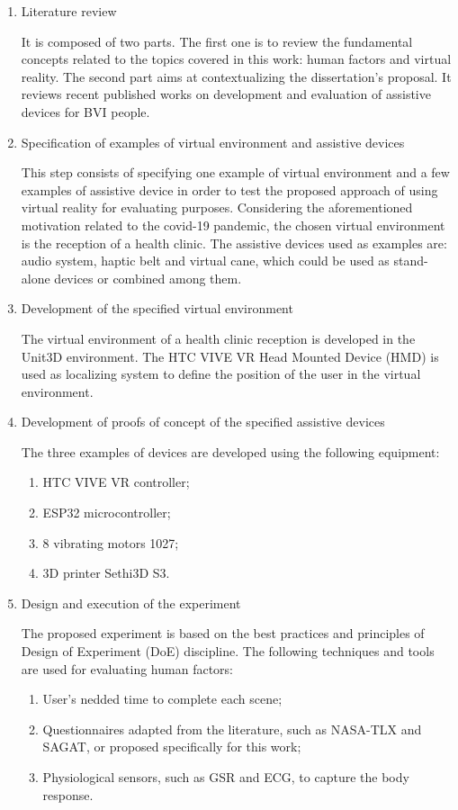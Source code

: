 \begin{enumerate}[label = Step \arabic* -- ]
    \item Literature review 
    
    It is composed of two parts. The first one is to review the fundamental concepts related to the topics covered in this work: human factors and virtual reality. The second part aims at contextualizing the dissertation’s proposal. It reviews recent published works on development and evaluation of assistive devices for BVI people.
    
    \item Specification of examples of virtual environment and assistive devices

    This step consists of specifying one example of virtual environment and a few examples of assistive device in order to test the proposed approach of using virtual reality for evaluating purposes. Considering the aforementioned motivation related to the covid-19 pandemic, the chosen virtual environment is the reception of a health clinic. The assistive devices used as examples are: audio system, haptic belt and virtual cane, which could be used as stand-alone devices or combined among them.
    
    \item Development of the specified virtual environment
    
    The virtual environment of a health clinic reception is developed in the Unit3D environment. The HTC VIVE VR Head Mounted Device (HMD) is used as localizing system to define the position of the user in the virtual environment.
    
    \item Development of proofs of concept of the specified assistive devices
    
    The three examples of devices are developed using the following equipment:
    \begin{enumerate}[label = \alph*)]
        \item HTC VIVE VR controller;
        \item ESP32 microcontroller;
        \item 8 vibrating motors 1027;
        \item 3D printer Sethi3D S3.
    \end{enumerate}
    
    \item Design and execution of the experiment
    
    The proposed experiment is based on the best practices and principles of Design of Experiment (DoE) discipline.
    The following techniques and tools are used for evaluating human factors:
    \begin{enumerate}[label = \alph*)]
        \item User's nedded time to complete each scene;
        \item Questionnaires adapted from the literature, such as NASA-TLX and SAGAT, or proposed specifically for this work;
        \item Physiological sensors, such as GSR and ECG, to capture the body response.
    \end{enumerate}
    

\end{enumerate}
